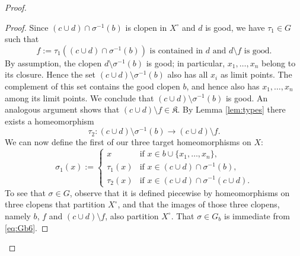 \documentclass[12pt,a4paper,reqno]{amsart}
\numberwithin{equation}{section}
\theoremstyle{plain}
\theoremstyle{definition}
\newcommand*{\proofclaimname}{Proof}
\newenvironment{proofclaim}[1][\proofclaimname]{\begin{proof}[#1]\renewcommand*{\qedsymbol}{\(\diamond\)}}{\end{proof}}
\begin{document}
\begin{proof}
\begin{proofclaim}
 Since $(c\cup d)\cap \sigma^{-1}(b)$ is clopen in $X^\circ$ and $d$ is good,
 we have $\tau_1\in G$ such that
\begin{equation} \label{eq:Gb1}
 f := \tau_1((c\cup d)\cap \sigma^{-1}(b)) \text{ is contained in } d \text{ and } d\setminus f \text{ is good}.
\end{equation}
By assumption, the clopen $d\setminus \sigma^{-1}(b)$ is good; in particular, $x_1,\dots, x_n$ belong to its closure.
 Hence the set $(c\cup d)\setminus \sigma^{-1}(b)$ also has all $x_i$ as limit points.
 The complement of this set contains the good clopen $b$, and hence also has $x_1,\dots, x_n$ among its
 limit points.
 We conclude that  $(c\cup d)\setminus \sigma^{-1}(b)$ is good.
 An analogous argument shows that $(c\cup d)\setminus f\in \mathfrak{K}$.
By Lemma \ref{lem:types} there exists a homeomorphism
\begin{equation*}
\tau_2 \colon (c\cup d)\setminus\sigma^{-1}(b)\rightarrow (c\cup d)\setminus f.
\end{equation*}
We can now define the first of our three target homeomorphisms on $X$:
\begin{equation}
\label{eq:Gb6}
\sigma_1(x) := 
\begin{cases}
x & \text{if } x\in b \cup \{x_1,\dots,x_n\}, \\
\tau_1(x) & \text{if } x\in (c\cup d)\cap \sigma^{-1}(b),\\
\tau_2(x) & \text{if } x\in (c\cup d)\cap \sigma^{-1}(c\cup d).
\end{cases}
\end{equation}
To see that $\sigma\in G$, observe that it is defined piecewise by homeomorphisms on three clopens that partition $X^\circ$,
and that the images of those three clopens, namely $b$, $f$ and $(c\cup d)\setminus f$,
also partition $X^\circ$. That $\sigma\in G_b$ is immediate from \eqref{eq:Gb6}.


\end{proofclaim}
\end{proof}
\end{document}
